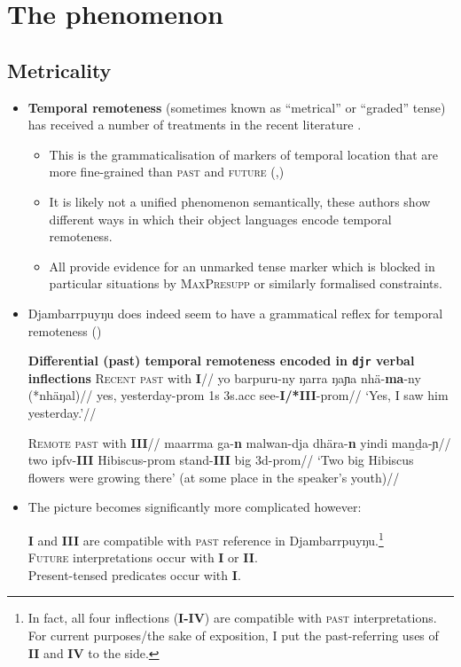 \documentclass[11pt]{article}
\begin{document}
\section*{The phenomenon}

\subsection*{Metricality}

\begin{itemize}
\item \textbf{Temporal remoteness} (sometimes known as ``metrical'' or ``graded'' tense) has received a number of treatments in the recent literature \citep[e.g][]{Klecha2016,Cable2013,Bohnemeyer2018}.
\begin{itemize}
\item This is the grammaticalisation of markers of temporal location that are more fine-grained than \textsc{past} and \textsc{future} (\citealp[84]{Comrie1983},\citealp{Dahl1983})
\item It is likely not a unified phenomenon semantically, these authors show different ways in which their object languages encode temporal remoteness.
\item All provide evidence for an unmarked tense marker which is blocked in particular situations by \textsc{MaxPresupp} or similarly formalised constraints.
\end{itemize}
\item Djambarrpuyŋu does indeed seem to have a grammatical reflex for temporal remoteness ()


\pex \textbf{Differential (past) temporal remoteness encoded in \texttt{djr} verbal inflections}
\a{}\begingl\glpreamble\textsc{Recent past} with \textbf{I}//
\gla yo barpuru-ny ŋarra ŋaɲa nhä-\textbf{ma}-ny (*nhäŋal)//
\glb	yes, yesterday{\sc-prom} 1s 3s{\sc.acc} see-\textbf{I/*III}-{\sc prom}//
\glft`Yes, I saw him yesterday.'//\endgl


\a{}\begingl\glpreamble\textsc{Remote past} with \textbf{III}//
\gla maarrma ga-\textbf{n} malwan-dja dhära-\textbf{n} yindi maṉḏa-ɲ//
\glb two {\sc ipfv-\textbf{III}} Hibiscus-{\sc prom} stand-\textbf{III} big 3d-{\sc prom}//
\glft`Two big Hibiscus flowers were growing there' (at some place in the speaker's youth)//
\endgl
\xe

\item The picture becomes significantly more complicated however:

\textbf{I} and \textbf{III} are compatible with \textsc{past} reference in Djambarrpuyŋu.\footnote{In fact, all four inflections (\textbf{I-IV}) are compatible with \textsc{past} interpretations. For current purposes/the sake of exposition, I put the past-referring uses of \textbf{II} and \textbf{IV} to the side.}\\\textsc{Future} interpretations occur with \textbf{I} or \textbf{II}.\\Present-tensed predicates occur with \textbf{I}.

\end{itemize}
\end{document}
